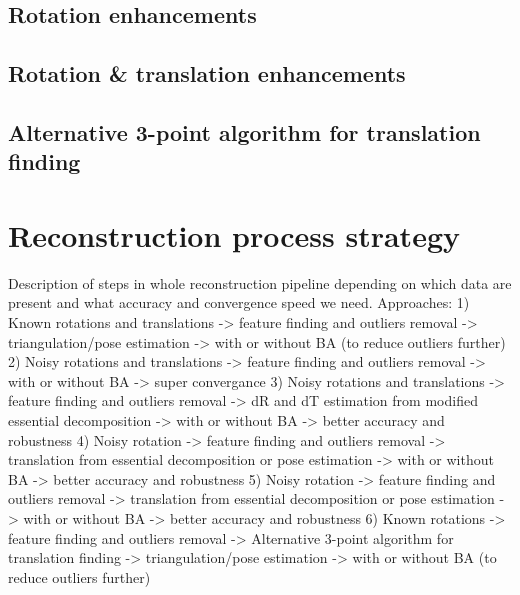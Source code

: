 \subsection{Rotation enhancements}
\subsection{Rotation \& translation enhancements}
\subsection{Alternative 3-point algorithm for translation finding}

\section{Reconstruction process strategy}
Description of steps in whole reconstruction pipeline depending on which data are present and what accuracy and convergence speed we need.
Approaches:
1) Known rotations and translations -> feature finding and outliers removal -> triangulation/pose estimation -> with or without BA (to reduce outliers further)
2) Noisy rotations and translations -> feature finding and outliers removal -> with or without BA -> super convergance
3) Noisy rotations and translations -> feature finding and outliers removal -> dR and dT estimation from modified essential decomposition -> with or without BA -> better accuracy and robustness
4) Noisy rotation -> feature finding and outliers removal -> translation from essential decomposition or pose estimation -> with or without BA -> better accuracy and robustness
5) Noisy rotation -> feature finding and outliers removal -> translation from essential decomposition or pose estimation -> with or without BA -> better accuracy and robustness
6) Known rotations -> feature finding and outliers removal -> Alternative 3-point algorithm for translation finding -> triangulation/pose estimation -> with or without BA (to reduce outliers further)



